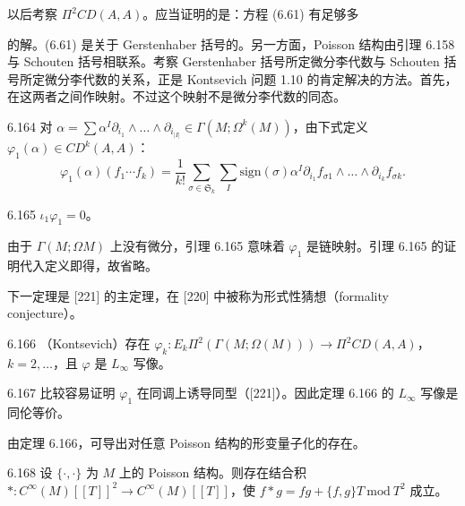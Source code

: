 以后考察 $\Pi^2CD(A,A)$。应当证明的是：方程 (6.61) 有足够多

的解。(6.61) 是关于 Gerstenhaber 括号的。另一方面，Poisson 结构由引理 6.158 与 Schouten 括号相联系。考察 Gerstenhaber 括号所定微分李代数与 Schouten 括号所定微分李代数的关系，正是 Kontsevich 问题 1.10 的肯定解决的方法。首先，在这两者之间作映射。不过这个映射不是微分李代数的同态。

\begin{definition}{6.164}
  对 $\alpha=\sum\alpha^I\partial_{i_1}\wedge\dots\wedge\partial_{i_{|I|}}\in\Gamma(M;\Omega^k(M))$，由下式定义 $\varphi_1(\alpha)\in CD^k(A,A)$：
  \[
    \varphi_1(\alpha)(f_1\cdots f_k)=\frac1{k!}\sum_{\sigma\in\mathfrak{S}_k}\sum_I\mathrm{sign}(\sigma)\alpha^I\partial_{i_1}f_{\sigma1}\wedge\dots\wedge\partial_{i_k}f_{\sigma k}.
  \]
\end{definition}

\begin{lemma}{6.165}
  $\iota_1\varphi_1=0$。
\end{lemma}

由于 $\Gamma(M;\Omega M)$ 上没有微分，引理 6.165 意味着 $\varphi_1$ 是链映射。引理 6.165 的证明代入定义即得，故省略。

下一定理是 [221] 的主定理，在 [220] 中被称为形式性猜想（formality conjecture）。

\begin{theorem}{6.166}
  （Kontsevich）存在 $\varphi_k:E_k\Pi^2(\Gamma(M;\Omega(M)))\to\Pi^2CD(A,A)$，$k=2,\dots$，且 $\varphi$ 是 $L_{\infty}$ 写像。
\end{theorem}

\begin{remark}{6.167}
  比较容易证明 $\varphi_1$ 在同调上诱导同型（[221]）。因此定理 6.166 的 $L_{\infty}$ 写像是同伦等价。
\end{remark}

由定理 6.166，可导出对任意 Poisson 结构的形变量子化的存在。

\begin{theorem}{6.168}
  设 $\{\cdot,\cdot\}$ 为 $M$ 上的 Poisson 结构。则存在结合积 $*:C^\infty(M)[[T]]^2\to C^\infty(M)[[T]]$，使 $f*g=fg+\{f,g\}T\ \mathrm{mod}\ T^2$ 成立。
\end{theorem}

